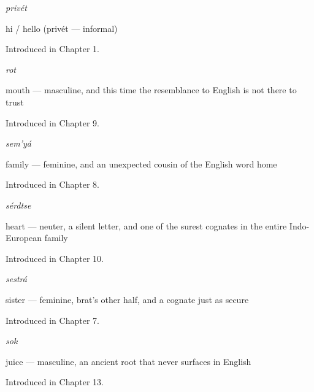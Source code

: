 \noindent\begin{minipage}[t]{\linewidth}
\raggedright
\textbf{}\enspace\emph{privét}\par
\small hi / hello (privét — informal)\par
\footnotesize Introduced in Chapter 1.
\end{minipage}\par\medskip

\noindent\begin{minipage}[t]{\linewidth}
\raggedright
\textbf{}\enspace\emph{rot}\par
\small mouth — masculine, and this time the resemblance to English is not there to trust\par
\footnotesize Introduced in Chapter 9.
\end{minipage}\par\medskip

\noindent\begin{minipage}[t]{\linewidth}
\raggedright
\textbf{}\enspace\emph{sem'yá}\par
\small family — feminine, and an unexpected cousin of the English word home\par
\footnotesize Introduced in Chapter 8.
\end{minipage}\par\medskip

\noindent\begin{minipage}[t]{\linewidth}
\raggedright
\textbf{}\enspace\emph{sérdtse}\par
\small heart — neuter, a silent letter, and one of the surest cognates in the entire Indo-European family\par
\footnotesize Introduced in Chapter 10.
\end{minipage}\par\medskip

\noindent\begin{minipage}[t]{\linewidth}
\raggedright
\textbf{}\enspace\emph{sestrá}\par
\small sister — feminine, brat's other half, and a cognate just as secure\par
\footnotesize Introduced in Chapter 7.
\end{minipage}\par\medskip

\noindent\begin{minipage}[t]{\linewidth}
\raggedright
\textbf{}\enspace\emph{sok}\par
\small juice — masculine, an ancient root that never surfaces in English\par
\footnotesize Introduced in Chapter 13.
\end{minipage}\par\medskip

